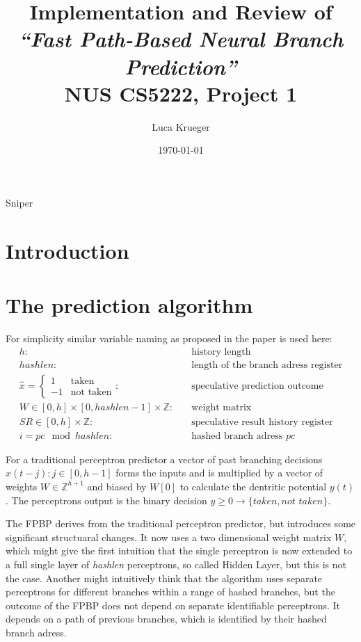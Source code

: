 \documentclass{article}
\title{Implementation and Review of \\ \textit{``Fast Path-Based Neural Branch Prediction\cite{fastpath}''} \\ NUS CS5222, Project 1}
\author{Luca Krueger}
\date{\today}
\begin{document}
\maketitle
Sniper\cite{carlson2014aeohmcm}

\section{Introduction}

\section{The prediction algorithm}
For simplicity similar variable naming as proposed in the paper is used here:
\begin{align*}
	h: \quad &\text{history length} \\%
	hashlen: \quad &\text{length of the branch adress register} \\
	\hat{x} = \begin{cases} 1 & \text{taken} \\ -1 & \text{not taken} \end{cases} : \quad &\text{speculative prediction outcome} \\
	W \in [0,h] \times [0,hashlen - 1] \times \mathbb{Z}: \quad &\text{weight matrix} \\
	SR \in [0,h]\times \mathbb{Z} : \quad &\text{speculative result history register}  \\
	i = pc \mod hashlen : \quad &\text{hashed branch adress } pc
\end{align*}

For a traditional perceptron predictor a vector of past branching decisions $\hat{x}(t-j) : j \in [0,h-1]$ forms the inputs and is multiplied by a vector of weights $W \in \mathbb{Z}^{h+1}$ and biased by $W[0]$ to calculate the dentritic potential $y(t)$. The perceptrons output is the binary decision $y\geq0 \rightarrow \{\textit{taken}, \textit{not taken}\}$.

The FPBP derives from the traditional perceptron predictor, but introduces some significant structuaral changes. It now uses a two dimensional weight matrix $W$, which might give the first intuition that the single perceptron is now extended to a full single layer of \textit{hashlen} perceptrons, so called Hidden Layer, but this is not the case. Another might intuitively think that the algorithm uses separate perceptrons for different branches within a range of hashed branches, but the outcome of the FPBP does not depend on separate identifiable perceptrons. It depends on a path of previous branches, which is identified by their hashed branch adress. 
\end{document}
